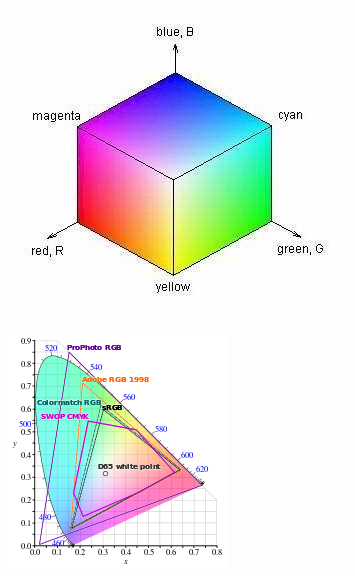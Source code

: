 \documentclass[a4paper,11pt]{article} %
\begin{document}
\begin{minipage}{0.34\textwidth}
    \centering
    \includegraphics[width=\linewidth]{RGBcube2}
\end{minipage}%
\begin{minipage}{0.33\textwidth}
    \centering
    \includegraphics[width=\linewidth]{RGBgamut}
\end{minipage}
\end{document}
